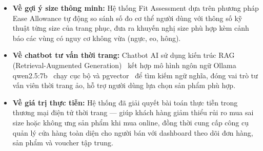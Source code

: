 \begin{itemize}[noitemsep]
    \item \textbf{Về gợi ý size thông minh:} Hệ thống Fit Assessment dựa trên phương pháp Ease Allowance tự động so sánh số đo cơ thể người dùng với thông số kỹ thuật từng size của trang phục, đưa ra khuyến nghị size phù hợp kèm cảnh báo các vùng có nguy cơ không vừa (ngực, eo, hông).

    \item \textbf{Về chatbot tư vấn thời trang:} Chatbot AI sử dụng kiến trúc RAG (Retrieval-Augmented Generation)~\cite{rag_lewis_2020} kết hợp mô hình ngôn ngữ Ollama qwen2.5:7b~\cite{ollama_docs} chạy cục bộ và pgvector~\cite{pgvector_github} để tìm kiếm ngữ nghĩa, đóng vai trò tư vấn viên thời trang ảo, hỗ trợ người dùng lựa chọn sản phẩm phù hợp.

    \item \textbf{Về giá trị thực tiễn:} Hệ thống đã giải quyết bài toán thực tiễn trong thương mại điện tử thời trang --- giúp khách hàng giảm thiểu rủi ro mua sai size hoặc không ưng sản phẩm khi mua online, đồng thời cung cấp công cụ quản lý cửa hàng toàn diện cho người bán với dashboard theo dõi đơn hàng, sản phẩm và voucher tập trung.
\end{itemize}
